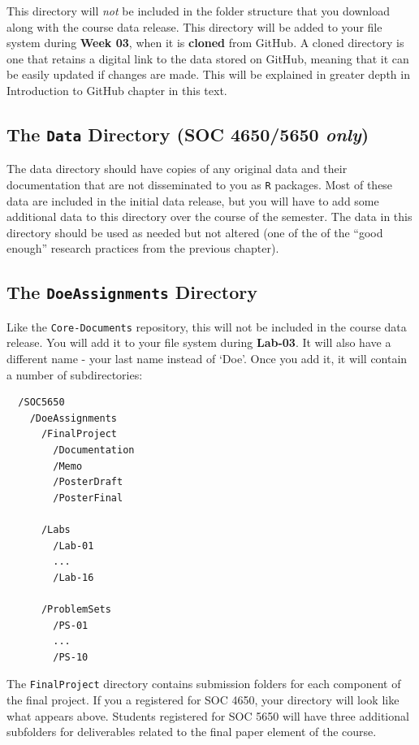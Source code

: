 \documentclass[]{book}
\theoremstyle{definition}
\theoremstyle{definition}
\theoremstyle{definition}
\theoremstyle{remark}
\begin{document}
This directory will \emph{not} be included in the folder structure that
you download along with the course data release. This directory will be
added to your file system during \textbf{Week 03}, when it is
\textbf{cloned} from GitHub. A cloned directory is one that retains a
digital link to the data stored on GitHub, meaning that it can be easily
updated if changes are made. This will be explained in greater depth in
Introduction to GitHub chapter in this text.

\subsection{\texorpdfstring{The \texttt{Data} Directory (SOC 4650/5650
\emph{only})}{The Data Directory (SOC 4650/5650 only)}}\label{the-data-directory-soc-46505650-only}

The data directory should have copies of any original data and their
documentation that are not disseminated to you as \texttt{R} packages.
Most of these data are included in the initial data release, but you
will have to add some additional data to this directory over the course
of the semester. The data in this directory should be used as needed but
not altered (one of the of the ``good enough'' research practices from
the previous chapter).

\subsection{\texorpdfstring{The \texttt{DoeAssignments}
Directory}{The DoeAssignments Directory}}\label{the-doeassignments-directory}

Like the \texttt{Core-Documents} repository, this will not be included
in the course data release. You will add it to your file system during
\textbf{Lab-03}. It will also have a different name - your last name
instead of `Doe'. Once you add it, it will contain a number of
subdirectories:

\begin{verbatim}
  /SOC5650
    /DoeAssignments
      /FinalProject
        /Documentation
        /Memo
        /PosterDraft
        /PosterFinal

      /Labs
        /Lab-01
        ...
        /Lab-16

      /ProblemSets
        /PS-01
        ...
        /PS-10
\end{verbatim}

The \texttt{FinalProject} directory contains submission folders for each
component of the final project. If you a registered for SOC 4650, your
directory will look like what appears above. Students registered for SOC
5650 will have three additional subfolders for deliverables related to
the final paper element of the course.
\end{document}
